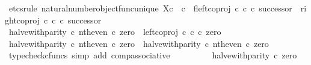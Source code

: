\begin{isabellebody}
\isamarkupfalse%
\ {\isacharparenleft}{\kern0pt}etcs{\isacharunderscore}{\kern0pt}rule\ natural{\isacharunderscore}{\kern0pt}number{\isacharunderscore}{\kern0pt}object{\isacharunderscore}{\kern0pt}func{\isacharunderscore}{\kern0pt}unique{\isacharbrackleft}{\kern0pt}\ X{\isacharequal}{\kern0pt}{\isachardoublequoteopen}{\isasymnat}\isactrlsub c\ {\isasymCoprod}\ {\isasymnat}\isactrlsub c{\isachardoublequoteclose}{\isacharcomma}{\kern0pt}\ \ f{\isacharequal}{\kern0pt}{\isachardoublequoteopen}{\isacharparenleft}{\kern0pt}left{\isacharunderscore}{\kern0pt}coproj\ {\isasymnat}\isactrlsub c\ {\isasymnat}\isactrlsub c\ {\isasymcirc}\isactrlsub c\ successor{\isacharparenright}{\kern0pt}\ {\isasymamalg}\ {\isacharparenleft}{\kern0pt}right{\isacharunderscore}{\kern0pt}coproj\ {\isasymnat}\isactrlsub c\ {\isasymnat}\isactrlsub c\ {\isasymcirc}\isactrlsub c\ successor{\isacharparenright}{\kern0pt}{\isachardoublequoteclose}{\isacharbrackright}{\kern0pt}{\isacharparenright}{\kern0pt}\isanewline
\ \ \isamarkupfalse%
\ {\isachardoublequoteopen}{\isacharparenleft}{\kern0pt}halve{\isacharunderscore}{\kern0pt}with{\isacharunderscore}{\kern0pt}parity\ {\isasymcirc}\isactrlsub c\ nth{\isacharunderscore}{\kern0pt}even{\isacharparenright}{\kern0pt}\ {\isasymcirc}\isactrlsub c\ zero\ {\isacharequal}{\kern0pt}\ left{\isacharunderscore}{\kern0pt}coproj\ {\isasymnat}\isactrlsub c\ {\isasymnat}\isactrlsub c\ {\isasymcirc}\isactrlsub c\ zero{\isachardoublequoteclose}\isanewline
\ \ \isamarkupfalse%
\ {\isacharminus}{\kern0pt}\isanewline
\ \ \ \ \isamarkupfalse%
\ {\isachardoublequoteopen}{\isacharparenleft}{\kern0pt}halve{\isacharunderscore}{\kern0pt}with{\isacharunderscore}{\kern0pt}parity\ {\isasymcirc}\isactrlsub c\ nth{\isacharunderscore}{\kern0pt}even{\isacharparenright}{\kern0pt}\ {\isasymcirc}\isactrlsub c\ zero\ {\isacharequal}{\kern0pt}\ halve{\isacharunderscore}{\kern0pt}with{\isacharunderscore}{\kern0pt}parity\ {\isasymcirc}\isactrlsub c\ nth{\isacharunderscore}{\kern0pt}even\ {\isasymcirc}\isactrlsub c\ zero{\isachardoublequoteclose}\isanewline
\ \ \ \ \ \ \isamarkupfalse%
\ {\isacharparenleft}{\kern0pt}typecheck{\isacharunderscore}{\kern0pt}cfuncs{\isacharcomma}{\kern0pt}\ simp\ add{\isacharcolon}{\kern0pt}\ comp{\isacharunderscore}{\kern0pt}associative{}{\isacharparenright}{\kern0pt}\isanewline
\ \ \ \ \isamarkupfalse%
\ \isamarkupfalse%
\ {\isachardoublequoteopen}{\isachardot}{\kern0pt}{\isachardot}{\kern0pt}{\isachardot}{\kern0pt}\ {\isacharequal}{\kern0pt}\ halve{\isacharunderscore}{\kern0pt}with{\isacharunderscore}{\kern0pt}parity\ {\isasymcirc}\isactrlsub c\ zero{\isachardoublequoteclose}\isanewline

\end{isabellebody}
